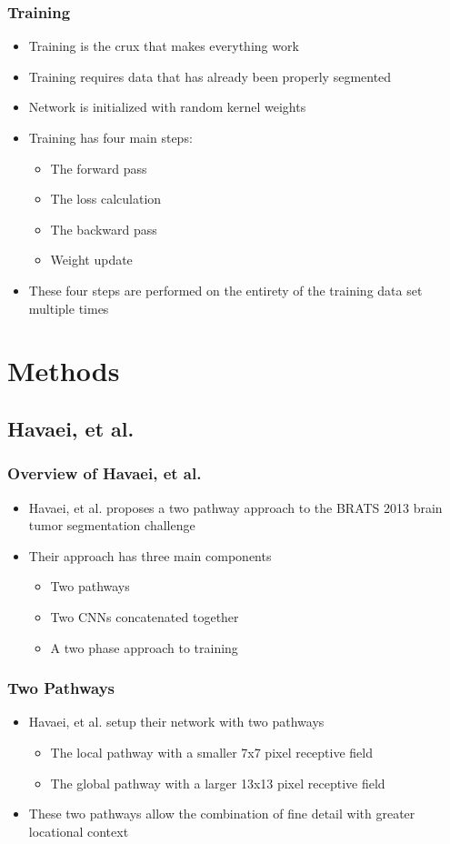 \documentclass{beamer}
\begin{document}
\begin{frame}
  \frametitle{Training}
  \begin{itemize}
	\item Training is the crux that makes everything work
	\item Training requires data that has already been properly segmented
	\item Network is initialized with random kernel weights
	\item Training has four main steps:
	\begin{itemize}
	  \item The forward pass
	  \item The loss calculation
	  \item The backward pass
	  \item Weight update
	\end{itemize}
	\item These four steps are performed on the entirety of the training data set multiple times
  \end{itemize}
\end{frame}

\section*{Methods}

\subsection*{Havaei, et al.}

\begin{frame}
  \frametitle{Overview of Havaei, et al.}
  \begin{itemize}
	\item Havaei, et al. proposes a two pathway approach to the BRATS 2013 brain tumor segmentation challenge
	\item Their approach has three main components
	\begin{itemize}
	  \item Two pathways
	  \item Two CNNs concatenated together
	  \item A two phase approach to training
	\end{itemize}
  \end{itemize}
\end{frame}

\begin{frame}
  \frametitle{Two Pathways}
  \begin{itemize}
	\item Havaei, et al. setup their network with two pathways
	\begin{itemize}
	  \item The local pathway with a smaller 7x7 pixel receptive field
	  \item The global pathway with a larger 13x13 pixel receptive field
	\end{itemize}
	\item These two pathways allow the combination of fine detail with greater locational context
  \end{itemize}
\end{frame}
\end{document}
